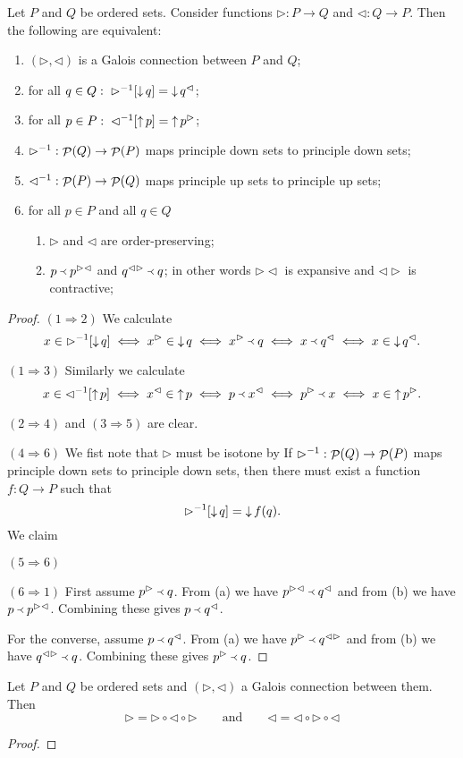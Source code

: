 \begin{proposition}
Let $P$ and $Q$ be ordered sets. Consider functions $\rhd: P\to Q$ and $\lhd: Q \to P$. Then the following are equivalent:
\begin{enumerate}
\item $(\rhd, \lhd)$ is a Galois connection between $P$ and $Q$;
\item for all $q\in Q: \; \rhd^{-1}[\mathop{\downarrow} q] = \mathop{\downarrow} q^\lhd$;
\item for all $p\in P: \; \lhd^{-1}[\mathop{\uparrow} p] = \mathop{\uparrow} p^\rhd$;
\item $\rhd^{-1}: \mathop{\mathcal{P}}(Q) \to \mathop{\mathcal{P}}(P)$ maps principle down sets to principle down sets;
\item $\lhd^{-1}: \mathop{\mathcal{P}}(P) \to \mathop{\mathcal{P}}(Q)$ maps principle up sets to principle up sets;
\item for all $p\in P$ and all $q\in Q$
\begin{enumerate}
\item $\rhd$ and $\lhd$ are order-preserving;
\item $p \Yleft p^{\rhd\lhd}$ and $q^{\lhd\rhd} \Yleft q$; in other words $\rhd\lhd$ is expansive and $\lhd\rhd$ is contractive;
\end{enumerate}
\end{enumerate}
\end{proposition}
\begin{proof}
$(1 \Rightarrow 2)$ We calculate
\[ x\in \rhd^{-1}[\mathop{\downarrow} q] \iff x^\rhd \in \mathop{\downarrow} q \iff x^\rhd \Yleft q \iff x \Yleft q^\lhd \iff x\in \mathop{\downarrow} q^\lhd. \]

$(1 \Rightarrow 3)$ Similarly we calculate
\[ x\in \lhd^{-1}[\mathop{\uparrow} p] \iff x^\lhd \in \mathop{\uparrow} p \iff p \Yleft x^\lhd \iff p^\rhd \Yleft x \iff x\in \mathop{\uparrow} p^\rhd. \]

$(2 \Rightarrow 4)$ and $(3 \Rightarrow 5)$ are clear.

$(4 \Rightarrow 6)$ We fist note that $\rhd$ must be isotone by If $\rhd^{-1}: \mathop{\mathcal{P}}(Q) \to \mathop{\mathcal{P}}(P)$ maps principle down sets to principle down sets, then there must exist a function $f: Q\to P$ such that
\[ \rhd^{-1}[\mathop{\downarrow} q] = \mathop{\downarrow} f(q). \]
We claim 

$(5 \Rightarrow 6)$ 

$(6 \Rightarrow 1)$ First assume $p^\rhd \Yleft q$. From (a) we have $p^{\rhd\lhd} \Yleft q^\lhd$ and from (b) we have $p \Yleft p^{\rhd\lhd}$. Combining these gives $p\Yleft q^\lhd$.

For the converse, assume $p \Yleft q^\lhd$. From (a) we have $p^{\rhd} \Yleft q^{\lhd\rhd}$ and from (b) we have $q^{\lhd\rhd} \Yleft q$. Combining these gives $p^{\rhd} \Yleft q$.
\end{proof}
\begin{corollary}
Let $P$ and $Q$ be ordered sets and $(\rhd, \lhd)$ a Galois connection between them. Then
\[ \rhd = \rhd\circ\lhd\circ\rhd \qquad\text{and}\qquad \lhd = \lhd\circ\rhd\circ\lhd \]
\end{corollary}
\begin{proof}

\end{proof}

